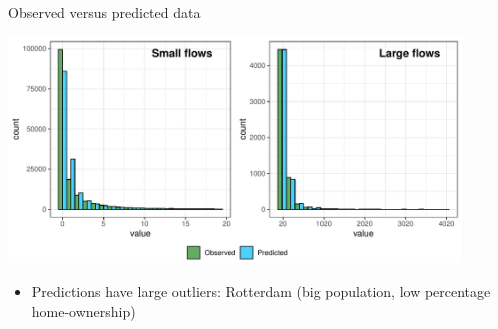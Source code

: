 \documentclass{beamer}
\begin{document}
%
%

\begin{frame}{Observed versus predicted data}
	\begin{center}
		\includegraphics[width=0.9\textwidth]{../fig/hist_fit}      
	\end{center}
\begin{itemize}
	\item Predictions have large outliers: Rotterdam (big population, low percentage home-ownership)
\end{itemize}
\end{frame}
\end{document}
